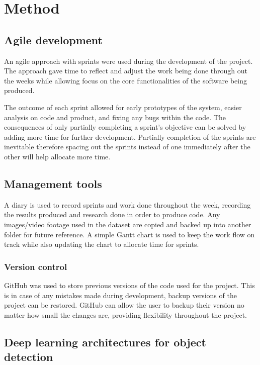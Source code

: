 \documentclass[12pt]{report}
\begin{document}
\chapter{Method}

\section{Agile development}

An agile approach with sprints were used during the development of the project. The approach gave time to reflect and adjust the work being done through out the weeks while allowing focus on the core functionalities of the software being produced. 

The outcome of each sprint allowed for early prototypes of the system, easier analysis on code and product, and fixing any bugs within the code. The consequences of only partially completing a sprint's objective can be solved by adding more time for further development. Partially completion of the sprints are inevitable therefore spacing out the sprints instead of one immediately after the other will help allocate more time. 

\section{Management tools}

A diary is used to record sprints and work done throughout the week, recording the results produced and research done in order to produce code. Any images/video footage used in the dataset are copied and backed up into another folder for future reference. A simple Gantt chart is used to keep the work flow on track while also updating the chart to allocate time for sprints.

\subsection{Version control}

GitHub was used to store previous versions of the code used for the project. This is in case of any mistakes made during development, backup versions of the project can be restored. GitHub can allow the user to backup their version no matter how small the changes are, providing flexibility throughout the project. 


\section{Deep learning architectures for object detection}
\end{document}

